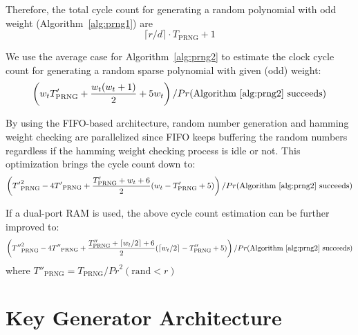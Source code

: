 \documentclass[runningheads]{llncs}
\begin{document}
Therefore, the total cycle count for generating a random polynomial with odd weight (Algorithm~\ref{alg:prng1}) are
\[
    \lceil r/d\rceil\cdot T_{\text{PRNG}} + 1
\]

We use the average case for Algorithm~\ref{alg:prng2} to estimate the clock cycle count for generating a random sparse polynomial with given (odd) weight:
\[
   \left(w_tT'_{\text{PRNG}} + \frac{w_t(w_t+1)}{2} + 5w_t\right)/Pr(\text{Algorithm~\ref{alg:prng2} succeeds})
\]

By using the FIFO-based architecture, random number generation and
hamming weight checking are parallelized since FIFO keeps buffering
the random numbers regardless if the hamming weight checking
process is idle or not. This optimization brings the cycle count down to:
\[
    \left({T'}_{\text{PRNG}}^2 - 4{T'}_{\text{PRNG}} + \frac{T'_{\text{PRNG}}+w_t+6}{2}(w_t-T'_{\text{PRNG}}+5)\right)/Pr(\text{Algorithm~\ref{alg:prng2} succeeds})
\]

If a dual-port RAM is used, the above cycle count estimation can be further improved to:
\[
    \left({T''}_{\text{PRNG}}^2 - 4{T''}_{\text{PRNG}} + \frac{T''_{\text{PRNG}}+\lceil w_t/2\rceil+6}{2}(\lceil w_t/2\rceil-T''_{\text{PRNG}}+5)\right)/Pr(\text{Algorithm~\ref{alg:prng2} succeeds})
\]
where ${T''}_{\text{PRNG}}=T_{\text{PRNG}}/{Pr}^2(\text{rand} < r)$







\section{Key Generator Architecture}
\label{sec::keygen}
\end{document}
